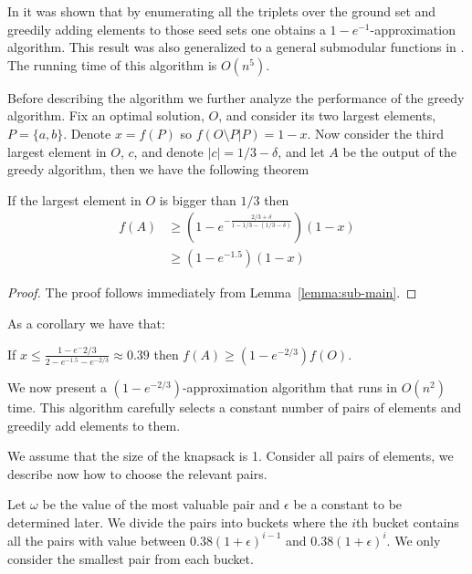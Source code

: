 In \cite{khuller1999budgeted} it was shown that by enumerating all the triplets over the 
ground set and greedily adding elements to those seed sets one obtains a 
$1-e^{-1}$-approximation algorithm.
This result was also generalized to a general submodular functions in \cite{sviridenko2004note}.
The running time of this algorithm is $O(n^5)$.

Before describing the algorithm we further analyze the performance of the greedy algorithm.
Fix an optimal solution, $O$, and consider its two largest elements, $P = \{a, b\}$.
Denote $x = f(P)$ so $f(O \setminus P | P) = 1 - x$.
Now consider the third largest element in $O$, $c$, and denote $|c| = 1/3 - \delta$,
and let $A$ be the output of the greedy algorithm, then we have the following theorem

\begin{theorem}
If the largest element in $O$ is bigger than $1/3$ then 
\begin{align*}
f(A) 	& \geq (1-e^{-\frac{2/3 + \delta}{1 - 1/3 - (1/3 - \delta)}})(1 - x)
\\		& \geq (1 - e^{-1.5})(1 - x) 
\end{align*}
\end{theorem} 

\begin{proof}
The proof follows immediately from Lemma~\ref{lemma:sub-main}.
\end{proof}

As a corollary we have that:

\begin{corollary}
If $x \leq \frac{1 - e^-{2/3}}{2 - e^{-1.5} - e^{-2/3}} \approx 0.39$ 
then $f(A) \geq (1 - e^{-2/3})f(O)$.
\end{corollary}

We now present a $(1-e^{-2/3})$-approximation algorithm that runs in $O(n^2)$ time.
This algorithm carefully selects a constant number of pairs of elements and greedily 
add elements to them.

We assume that the size of the knapsack is 1.
Consider all pairs of elements, we describe now how to choose the relevant pairs.

Let $\omega$ be the value of the most valuable pair and $\epsilon$ be a constant to 
be determined later.
We divide the pairs into buckets where the $i$th bucket contains all the pairs with value
between $0.38 (1 + \epsilon)^{i - 1}$ and $0.38 (1 + \epsilon)^{i}$.
We only consider the smallest pair from each bucket.  

